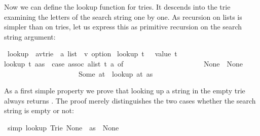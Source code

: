 \begin{isabellebody}
\begin{isamarkuptext}%
Now we can define the lookup function for tries. It descends into the trie
examining the letters of the search string one by one. As
recursion on lists is simpler than on tries, let us express this as primitive
recursion on the search string argument:%
\end{isamarkuptext}%
\isamarkuptrue%
\isamarkupfalse%
\ lookup\ {}{}\ {}{}{}a{}{}v{}trie\ {}\ {}a\ list\ {}\ {}v\ option{}\ \isanewline
{}lookup\ t\ {}{}\ {}\ value\ t{}\ {}\isanewline
{}lookup\ t\ {}a{}as{}\ {}\ {}case\ assoc\ {}alist\ t{}\ a\ of\isanewline
\ \ \ \ \ \ \ \ \ \ \ \ \ \ \ \ \ \ \ \ \ \ None\ {}\ None\isanewline
\ \ \ \ \ \ \ \ \ \ \ \ \ \ \ \ \ \ \ \ {}\ Some\ at\ {}\ lookup\ at\ as{}{}%
\begin{isamarkuptext}%
As a first simple property we prove that looking up a string in the empty
trie  always returns . The proof merely
distinguishes the two cases whether the search string is empty or not:%
\end{isamarkuptext}%
\isamarkuptrue%
\isamarkupfalse%
\ {}simp{}{}\ {}lookup\ {}Trie\ None\ {}{}{}\ as\ {}\ None{}\isanewline

\end{isabellebody}
